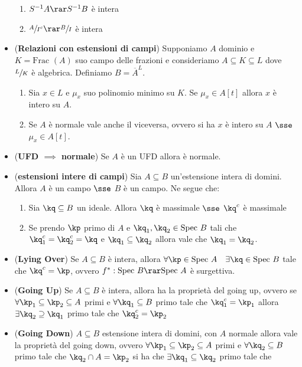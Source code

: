 \documentclass[a4paper,NoNotes,GeneralMath]{stdmdoc}
\newcommand{\intclos}[2]{\ensuremath{\overline{#1}^{#2}}}
\newcommand{\Frac}{\text{Frac }}
\newcommand{\Spec}{\text{Spec }}
\begin{document}
\begin{itemize}
\begin{enumerate}
  \item $S^{-1}A \rar S^{-1}B$ è intera
  \item $\sfrac{A}{I^c} \rar \sfrac{B}{I}$ è intera
  \end{enumerate}
\item ({\bf Relazioni con estensioni di campi}) Supponiamo $A$ dominio e
  $K = \Frac(A)$ suo campo delle frazioni e consideriamo
  $A \subseteq K \subseteq L$ dove $\sfrac{L}{K}$ è algebrica. Definiamo
  $B = \intclos{A}{L}$.
  \begin{enumerate}
  \item Sia $x \in L$ e $\mu_x$ suo polinomio minimo su $K$. Se
    $\mu_x \in A[t]$ allora $x$ è intero su $A$.
  \item Se $A$ è normale vale anche il viceversa, ovvero si ha $x$ è
    intero su $A$ $\sse$ $\mu_x \in A[t]$.
  \end{enumerate}
\item ({\bf UFD $\implies$ normale}) Se $A$ è un UFD allora è normale.
\item ({\bf estensioni intere di campi}) Sia $A \subseteq B$
  un'estensione intera di domini. Allora $A$ è un campo $\sse$ $B$ è un
  campo. Ne segue che:
  \begin{enumerate}
  \item Sia $\kq \subseteq B$ un ideale. Allora $\kq$ è massimale $\sse$
    $\kq^c$ è massimale
  \item Se prendo $\kp$ primo di $A$ e $\kq_1, \kq_2 \in \Spec B$ tali
    che $\kq_1^c = \kq_2^c = \kq$ e $\kq_1 \subseteq \kq_2$ allora vale
    che $\kq_1 = \kq_2$.
  \end{enumerate}
\item ({\bf Lying Over}) Se $A \subseteq B$ è intera, allora $\forall
  \kp \in \Spec A \quad \exists \kq \in \Spec B$ tale che $\kq^c = \kp$,
  ovvero $f^*: \Spec B \rar \Spec A$ è surgettiva.
\item ({\bf Going Up}) Se $A \subseteq B$ è intera, allora ha la
  proprietà del going up, ovvero se
  $\forall \kp_1 \subseteq \kp_2 \subseteq A$ primi e
  $\forall \kq_1 \subseteq B$ primo tale che $\kq_1^c = \kp_1$ allora
  $\exists \kq_2 \supseteq \kq_1$ primo tale che $\kq_2^c = \kp_2$
\item ({\bf Going Down}) $A \subseteq B$ estensione intera di domini,
  con $A$ normale allora vale la proprietà del going down, ovvero
  $\forall \kp_1 \subseteq \kp_2 \subseteq A$ primi e
  $\forall \kq_2 \subseteq B$ primo tale che $\kq_2 \cap A = \kp_2$ si
  ha che $\exists \kq_1 \subseteq \kq_2$ primo tale che

\end{itemize}
\end{document}
